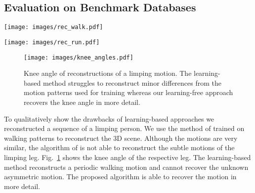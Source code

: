 \documentclass[10pt,letterpaper]{article}
\begin{document}
\subsection{Evaluation on Benchmark Databases}
\begin{figure*}[t]
	\begin{center}
		\texttt{[image: images/rec\_walk.pdf]}
	\end{center}
	\caption{Reconstruction of a walking motion from the CMU data base subject 35/02.}
	\label{fig_walk}
\end{figure*}

\begin{figure*}[!ht]
	\begin{center}
		\texttt{[image: images/rec\_run.pdf]}
	\end{center}
	\caption{Reconstruction of a running motion from the CMU data base subject 35/17.}
	\label{fig_run}
\end{figure*}

\begin{figure}[t]
	\begin{center}
		\texttt{[image: images/knee\_angles.pdf]}
	\end{center}
	\caption{Knee angle of reconstructions of a limping motion. The learning-based method \cite{Wandt2016} struggles to reconstruct minor differences from the motion patterns used for training whereas our learning-free approach recovers the knee angle in more detail.}
	\label{fig_baseposes}
\end{figure} 

To qualitatively show the drawbacks of learning-based approaches we reconstructed a sequence of a limping person. We use the method of \cite{Wandt2016} trained on walking patterns to reconstruct the 3D scene. Although the motions are very similar, the algorithm of \cite{Wandt2016} is not able to reconstruct the subtle motions of the limping leg. Fig.~\ref{fig_baseposes} shows the knee angle of the respective leg. The learning-based method reconstructs a periodic walking motion and cannot recover the unknown asymmetric motion. The proposed algorithm is able to recover the motion in more detail.
\end{document}
